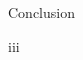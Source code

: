 
\begin{frame}{Conclusion}
    \begin{enumerate}[<+-|alert@+>]
        \myitem iii
    \end{enumerate}
\end{frame}


